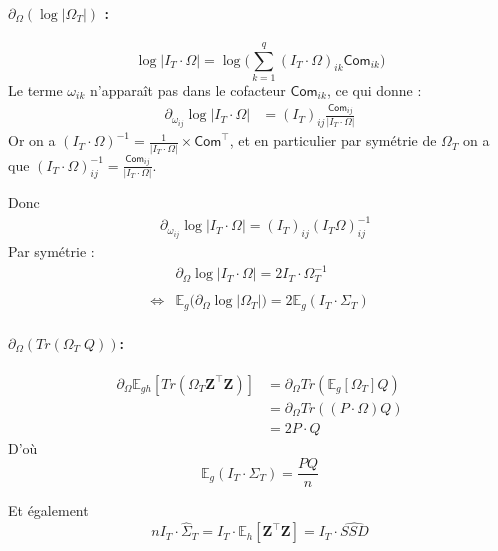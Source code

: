 \documentclass[11pt,a4paper]{article}
\newcommand{\Zbf}{\boldsymbol{Z}}
\newcommand{\Esp}{\mathds{E}}
\begin{document}
\paragraph{\underline{$\partial_{\Omega}( \log |\Omega_T|)$} :}
 $$\log |I_T \cdot \Omega| = \log \big(\sum_{k=1}^q (I_T\cdot \Omega)_{ik} \mathsf{Com}_{ik}\big)$$
Le terme $\omega_{ik}$ n'apparaît pas dans le cofacteur $\mathsf{Com}_{ik}$, ce qui donne :
\begin{align*}
    \partial_{\omega_{ij}} \log |I_T\cdot \Omega| &= (I_T)_{ij} \frac{\mathsf{Com}_{ij}}{|I_T\cdot \Omega |}
\end{align*}
Or on a $(I_T\cdot \Omega)^{-1} = \frac{1}{|I_T \cdot \Omega|}\times \mathsf{Com}^\intercal$, et en particulier par symétrie de $\Omega_T$ on a que $(I_T\cdot \Omega)_{ij}^{-1}=\frac{\mathsf{Com}_{ij}}{|I_T\cdot \Omega |}$.

Donc 
\begin{align}
         &\partial_{\omega_{ij}} \log |I_T\cdot \Omega| = (I_T)_{ij} (I_T\Omega)_{ij}^{-1}
\end{align}
Par symétrie :
\begin{align}
    &\partial_\Omega \log |I_T\cdot \Omega| = 2I_T \cdot \Omega_T^{-1}\\\\
    \iff &\Esp_g \big( \partial_\Omega \log |\Omega_T| \big) = 2\Esp_g (I_T\cdot \Sigma_T) 
\end{align}

\paragraph{\underline{$ \partial_\Omega (Tr(\Omega_T \; Q ))$}:}
\begin{align}
    \partial_\Omega \Esp_{gh}[Tr(\Omega_T \Zbf^\intercal \Zbf)]&=\partial_\Omega Tr(\Esp_g[\Omega_T]Q)\\
    &=\partial_\Omega Tr((P\cdot\Omega)Q)\\
    &=2P\cdot Q
\end{align}
D'où $$ \Esp_g (I_T\cdot \Sigma_T)  = \frac{PQ}{n}$$

Et également 
$$\boxed{n I_T\cdot \hat{\Sigma}_T = I_T\cdot \Esp_h[\Zbf^\intercal \Zbf] = I_T\cdot \widehat{SSD}}$$
\end{document}
